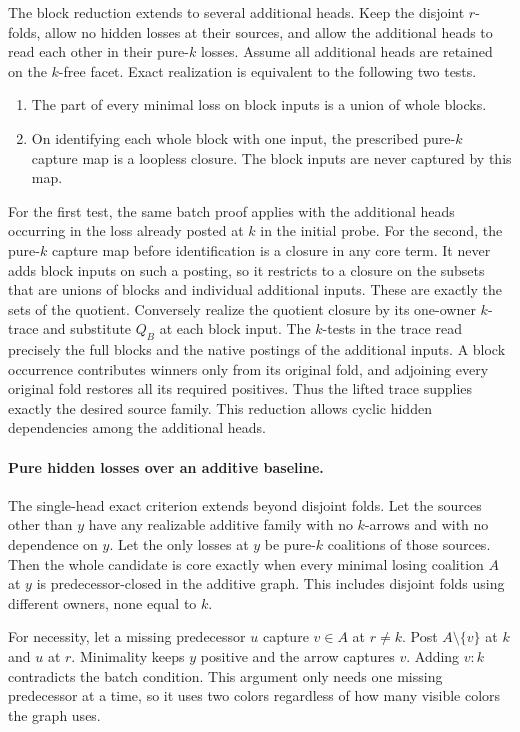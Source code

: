The block reduction extends to several additional
heads. Keep the disjoint $r$-folds, allow no hidden
losses at their sources, and allow the additional
heads to read each other in their pure-$k$ losses.
Assume all additional heads are retained on the
$k$-free facet. Exact realization is equivalent to
the following two tests.
\begin{enumerate}
\item The part of every minimal loss on block
inputs is a union of whole blocks.
\item On identifying each whole block with one
input, the prescribed pure-$k$ capture map is a
loopless closure. The block inputs are never
captured by this map.
\end{enumerate}
For the first test, the same batch proof applies
with the additional heads occurring in the loss
already posted at $k$ in the initial probe.
For the second, the pure-$k$ capture map before
identification is a closure in any core term.
It never adds block inputs on such a posting,
so it restricts to a closure on the subsets
that are unions of blocks and individual
additional inputs. These are exactly the sets
of the quotient. Conversely realize the quotient
closure by its one-owner $k$-trace and substitute
$Q_B$ at each block input. The $k$-tests in the
trace read precisely the full blocks and the
native postings of the additional inputs.
A block occurrence contributes winners only
from its original fold, and adjoining every
original fold restores all its required
positives. Thus the lifted trace supplies
exactly the desired source family. This
reduction allows cyclic hidden dependencies
among the additional heads.

\paragraph{Pure hidden losses over an additive baseline.}
The single-head exact criterion extends beyond
disjoint folds. Let the sources other than $y$
have any realizable additive family with no
$k$-arrows and with no dependence on $y$. Let the
only losses at $y$ be pure-$k$ coalitions of
those sources. Then the whole candidate is core
exactly when every minimal losing coalition
$A$ at $y$ is predecessor-closed in the additive
graph. This includes disjoint folds using different
owners, none equal to $k$.

For necessity, let a missing predecessor $u$
capture $v\in A$ at $r\ne k$. Post $A\setminus
\{v\}$ at $k$ and $u$ at $r$. Minimality keeps
$y$ positive and the arrow captures $v$. Adding
$v:k$ contradicts the batch condition. This
argument only needs one missing predecessor at a
time, so it uses two colors regardless of how many
visible colors the graph uses.

